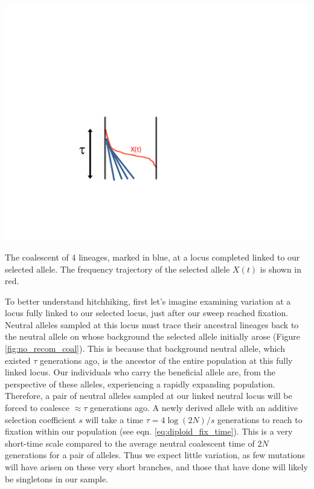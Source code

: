 \begin{marginfigure}
\begin{center}
\includegraphics[width= 0.75 \textwidth]{figures/Hitchhiking/No_recom_coal.pdf}
\end{center}
\caption{The coalescent of 4 lineages, marked in blue, at a locus completed linked to our selected allele. The frequency trajectory of the selected allele $X(t)$ is shown in red.} \label{fig:no_recom_coal}
\end{marginfigure}
To better understand hitchhiking, first let's imagine examining variation at a locus fully linked
to our selected locus, just after our sweep reached fixation. Neutral alleles sampled at this locus
must trace their ancestral lineages back to the neutral
allele on whose background the selected allele initially arose (Figure
\ref{fig:no_recom_coal}). This is because
that background neutral allele, which existed $\tau$ generations ago, is the
ancestor of the entire population at this fully linked locus. Our individuals who
carry the beneficial allele are, from the perspective of these 
alleles, experiencing a rapidly expanding population. Therefore, a
pair of neutral alleles sampled at our linked neutral locus will be forced to
coalesce $\approx \tau$ generations ago. A newly derived allele with an additive selection coefficient $s$ will
take a time $\tau = 4\log(2N)/s$ generations to reach to fixation
within our population (see eqn. \eqref{eq:diploid_fix_time}). This is a very
short-time scale compared to the average neutral coalescent time of
$2N$ generations for a pair of alleles. Thus we expect little variation,
as few mutations will have arisen on these very short branches, and
those that have done will likely be singletons in our sample. \\

